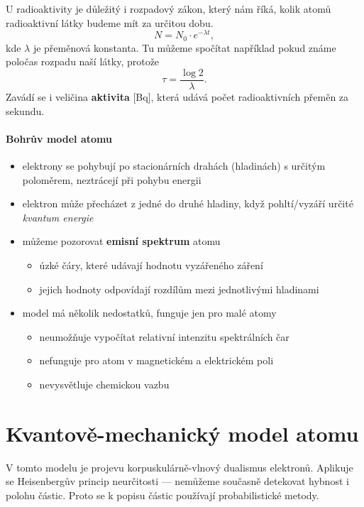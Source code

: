 \documentclass[DIV=8]{scrreprt}
\begin{document}
U radioaktivity je důležitý i rozpadový zákon, který nám říká, kolik atomů radioaktivní látky budeme mít za určitou dobu.
\[N = N_0 \cdot e^{-\lambda t},\]
kde \(\lambda\) je přeměnová konstanta. Tu můžeme spočítat například pokud známe poločas rozpadu naší látky, protože
\[\tau = \frac{\log 2}{\lambda}.\]
Zavádí se i veličina \textbf{aktivita} [Bq], která udává počet radioaktivních přeměn za sekundu.

\paragraph{Bohrův model atomu}
\begin{itemize}[nosep]
    \item elektrony se pohybují po stacionárních drahách (hladinách) s určitým poloměrem, neztrácejí při pohybu energii
    \item elektron může přecházet z jedné do druhé hladiny, když pohltí/vyzáří určité \emph{kvantum energie}
    \item můžeme pozorovat \textbf{emisní spektrum} atomu
\begin{itemize}[nosep]
    \item úzké čáry, které udávají hodnotu vyzářeného záření
    \item jejich hodnoty odpovídají rozdílům mezi jednotlivými hladinami
\end{itemize}

    \item model má několik nedostatků, funguje jen pro malé atomy
\begin{itemize}[nosep]
    \item neumožňuje vypočítat relativní intenzitu spektrálních čar
    \item nefunguje pro atom v magnetickém a elektrickém poli
    \item nevysvětluje chemickou vazbu
\end{itemize}

\end{itemize}



\section{Kvantově-mechanický model atomu} \label{Kvantově-mechanický model atomu}


V tomto modelu je projevu korpuskulárně-vlnový dualismus elektronů. Aplikuje se Heisenbergův princip neurčitosti --- nemůžeme současně detekovat hybnost i polohu částic. Proto se k popisu částic používají probabilistické metody.
\end{document}
